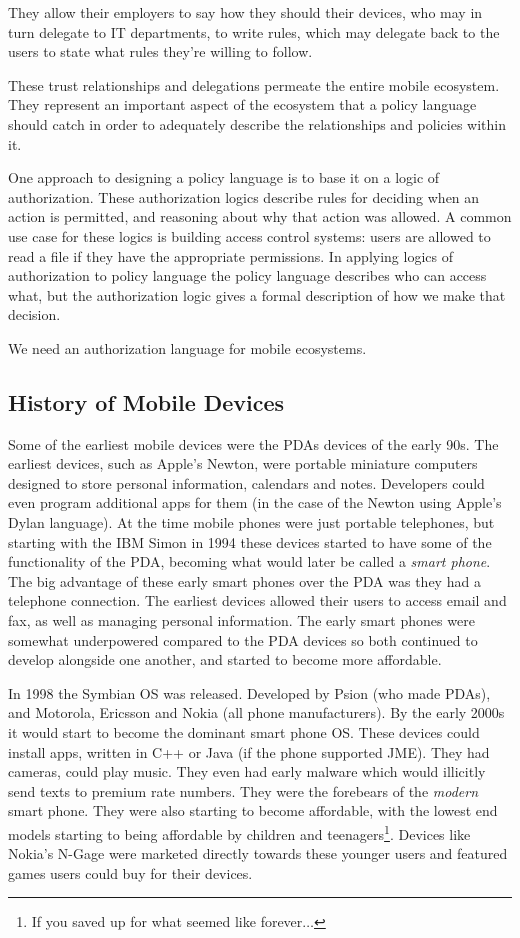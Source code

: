 \documentclass[thesis.tex]{subfiles}
\begin{document}
They allow their employers to say how they should their devices, who
may in turn delegate to IT departments, to write rules, which may
delegate back to the users to state what rules they're willing to
follow.

These trust relationships and delegations permeate the entire mobile
ecosystem.  They represent an important aspect of the ecosystem that a
policy language should catch in order to adequately describe the
relationships and policies within it.

One approach to designing a policy language is to base it on a logic
of authorization.  These authorization logics describe rules for
deciding when an action is permitted, and reasoning about why that
action was allowed.  A common use case for these logics is building
access control systems: users are allowed to read a file if they have
the appropriate permissions.  In applying logics of authorization to
policy language the policy language describes who can access what, but
the authorization logic gives a formal description of how we make that
decision.

We need an authorization language for mobile ecosystems.


\subsection{History of Mobile Devices}

Some of the earliest mobile devices were the \acp{PDA} devices of the
early 90s.  The earliest devices, such as Apple's Newton, were
portable miniature computers designed to store personal information,
calendars and notes.  Developers could even program additional apps
for them (in the case of the Newton using Apple's Dylan language).  At
the time mobile phones were just portable telephones, but starting
with the IBM Simon in 1994 these devices started to have some of the
functionality of the \ac{PDA}, becoming what would later be called a
\emph{smart phone}.  The big advantage of these early smart phones
over the \ac{PDA} was they had a telephone connection.  The earliest
devices allowed their users to access email and fax, as well as
managing personal information.  The early smart phones were somewhat
underpowered compared to the \ac{PDA} devices so both continued to
develop alongside one another, and started to become more affordable.

In 1998 the Symbian OS was released.  Developed by Psion (who made
\acp{PDA}), and Motorola, Ericsson and Nokia (all phone
manufacturers).  By the early 2000s it would start to become the
dominant smart phone OS.  These devices could install apps, written in
C++ or Java (if the phone supported JME). They had cameras, could play
music. They even had early malware which would illicitly send texts to
premium rate numbers.  They were the forebears of the \emph{modern}
smart phone.
They were also starting to become affordable, with the lowest end
models starting to being affordable by children and
teenagers\footnote{If you saved up for what seemed like
  forever$\ldots$}.  Devices like Nokia's N-Gage were marketed directly
towards these younger users and featured games users could buy for
their devices.
\end{document}
